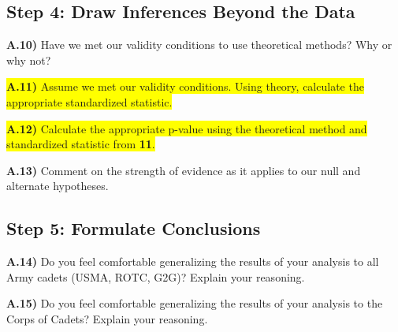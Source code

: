 \documentclass{article}
\newif\ifPrintSolution
\newcommand{\sol}[1]{\ifPrintSolution {\color{blue} #1 } \fi}
\begin{document}
\subsection*{Step 4: Draw Inferences Beyond the Data}

\textbf{A.10)} Have we met our validity conditions to use theoretical methods? Why or why not?

\sol{Yes, for quantitative data we have more than 20 observations and the data is not strongly skewed.}

\vspace{0.2in}

\colorbox{yellow}{\textbf{A.11)} Assume we met our validity conditions. Using theory, calculate the appropriate standardized statistic.}

\sol{ $t = \frac{304 - 270}{\frac{29.1}{\sqrt{293}}}$ = 19.99953}

\vspace{0.3in}

\colorbox{yellow}{\textbf{A.12)} Calculate the appropriate p-value using the theoretical method and standardized statistic from \textbf{11}.}

\sol{$2*(1 - pt(abs(19.99953), 292)) = 0$}

\vspace{0.3in}

\textbf{A.13)} Comment on the strength of evidence as it applies to our null and alternate hypotheses.

\sol{ With a p-value of (computationally) 0, we have very strong evidence that the true mean of corps of cadets APFT scores is not equal to 270.}

\vspace{0.1in}

\subsection*{Step 5: Formulate Conclusions}

\textbf{A.14)} Do you feel comfortable generalizing the results of your analysis to all Army cadets (USMA, ROTC, G2G)? Explain your reasoning.

\sol{No, those observational units did not have an equal chance of being selected and so we cannot generalize these results.}

\vspace{0.25in}

\textbf{A.15)} Do you feel comfortable generalizing the results of your analysis to the Corps of Cadets? Explain your reasoning.
\end{document}
